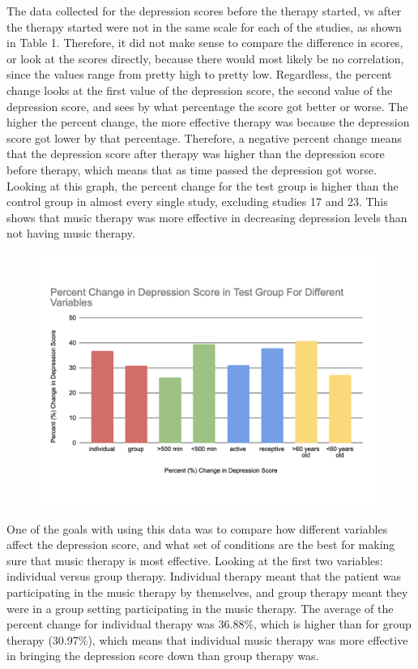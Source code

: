 \documentclass[12pt]{article}
\begin{document}
 The data collected for the depression scores before the therapy started, vs after the therapy started were not in the same scale for each of the studies, as shown in Table 1. Therefore, it did not make sense to compare the difference in scores, or look at the scores directly, because there would most likely be no correlation, since the values range from pretty high to pretty low. Regardless, the percent change looks at the first value of the depression score, the second value of the depression score, and sees by what percentage the score got better or worse. The higher the percent change, the more effective therapy was because the depression score got lower by that percentage. Therefore, a negative percent change means that the depression score after therapy was higher than the depression score before therapy, which means that as time passed the depression got worse. Looking at this graph, the percent change for the test group is higher than the control group in almost every single study, excluding studies 17 and 23. This shows that music therapy was more effective in decreasing depression levels than not having music therapy.

 \begin{figure}[h!]
  \centering
  \includegraphics[width=12 cm]{CHART2.png}
  \label{fig:chart2}
\end{figure}

 One of the goals with using this data was to compare how different variables affect the depression score, and what set of conditions are the best for making sure that music therapy is most effective. Looking at the first two variables: individual versus group therapy. Individual therapy meant that the patient was participating in the music therapy by themselves, and group therapy meant they were in a group setting participating in the music therapy. The average of the percent change for individual therapy was 36.88\%, which is higher than for group therapy (30.97\%), which means that individual music therapy was more effective in bringing the depression score down than group therapy was. 
 
\end{document}
